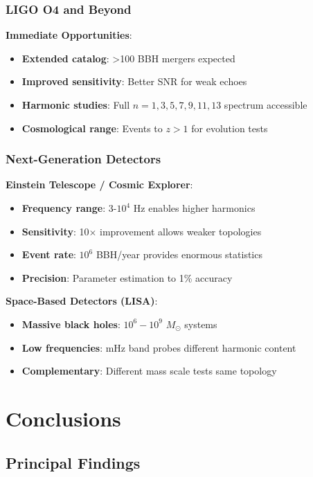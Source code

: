\documentclass[11pt,a4paper]{article}
\newcommand{\Msun}{M_{\odot}}
\begin{document}
\subsubsection{LIGO O4 and Beyond}

\textbf{Immediate Opportunities}:
\begin{itemize}
    \item \textbf{Extended catalog}: >100 BBH mergers expected
    \item \textbf{Improved sensitivity}: Better SNR for weak echoes
    \item \textbf{Harmonic studies}: Full $n=1,3,5,7,9,11,13$ spectrum accessible
    \item \textbf{Cosmological range}: Events to $z>1$ for evolution tests
\end{itemize}

\subsubsection{Next-Generation Detectors}

\textbf{Einstein Telescope / Cosmic Explorer}:
\begin{itemize}
    \item \textbf{Frequency range}: 3-$10^4$ Hz enables higher harmonics
    \item \textbf{Sensitivity}: 10$\times$ improvement allows weaker topologies
    \item \textbf{Event rate}: $10^6$ BBH/year provides enormous statistics
    \item \textbf{Precision}: Parameter estimation to 1\% accuracy
\end{itemize}

\textbf{Space-Based Detectors (LISA)}:
\begin{itemize}
    \item \textbf{Massive black holes}: $10^6-10^9$ $\Msun$ systems
    \item \textbf{Low frequencies}: mHz band probes different harmonic content
    \item \textbf{Complementary}: Different mass scale tests same topology
\end{itemize}

\section{Conclusions}

\subsection{Principal Findings}
\end{document}
